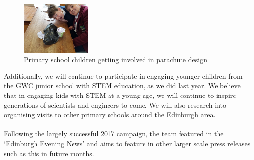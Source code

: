\documentclass{report}
\begin{document}
		\begin{figure}
			\vspace{-30pt}
	 		\begin{center}
			\includegraphics[width=0.31\textwidth]{p5s}
			\end{center}
			\vspace{-15pt}
			\caption[X]{Primary school children getting involved in parachute design}
		\end{figure}

		\noindent
		Additionally, we will continue to participate in engaging younger children
		from the GWC junior school with STEM education, as we did last year.
		We believe that in engaging kids with STEM at a young age, we will continue
		to inspire generations of scientists and engineers to come. We will also
		research into organising visits to other primary schools around the Edinburgh
		area.\\\\
		Following the largely successful 2017 campaign, the team featured in the
		 `Edinburgh Evening News' and aims to feature in other larger scale press
		releases such as this in future months.
\end{document}
